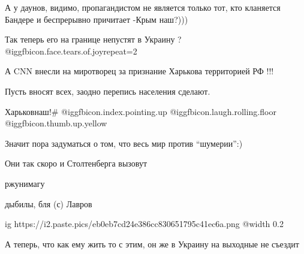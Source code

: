  
 
 
 
 
\zzSecCmt

\begin{itemize} %

А у даунов, видимо, пропагандистом не является только тот, кто кланяется
Бандере и беспрерывно причитает -Крым  наш?)))


Так теперь его на границе непустят в Украину ?  @igg{fbicon.face.tears.of.joy}{repeat=2} 

А CNN внесли на миротворец за признание Харькова территорией РФ !!!


Пусть вносят всех, заодно перепись населения сделают.


Харьковнаш!\# @igg{fbicon.index.pointing.up} @igg{fbicon.laugh.rolling.floor}
@igg{fbicon.thumb.up.yellow} 


Значит пора задуматься о том, что весь мир против \enquote{шумерии}:)


Они так скоро и Столтенберга вызовут


ржунимагу


дыбилы, бля (с) Лавров


\ifcmt
  ig https://i2.paste.pics/eb0eb7cd24e386cc830651795c41ec6a.png
  @width 0.2
\fi


А теперь, что как ему жить то с этим, он же в Украину на выходные не съездит

\end{itemize} %
